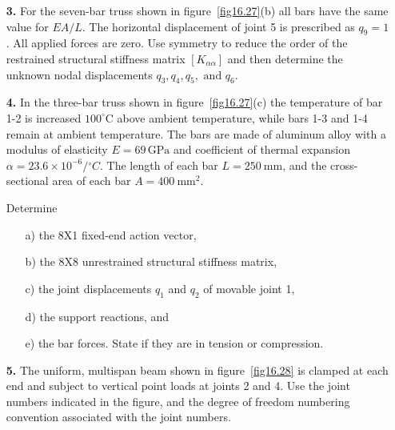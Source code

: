 \documentclass{AeroStructure-ERJohnson}
\begin{document}
\begin{exercise}
\begin{enumerate}[\textbf{2.}]
\pagebreak

\item[\textbf{3.}] For the seven-bar truss shown in figure~\ref{fig16.27}(b) all bars have the same value for $E A / L$. The horizontal displacement of joint 5 is prescribed as $q_{9}=1$. All applied forces are zero. Use symmetry to reduce the order of the restrained structural stiffness matrix $\left[K_{\alpha \alpha}\right]$ and then determine the unknown nodal displacements $q_{3}, q_{4}, q_{5}, \text { and } q_{6}$.

\item[\textbf{4.}] In the three-bar truss shown in figure~\ref{fig16.27}(c) the temperature of bar 1-2 is increased $100^{\circ} \mathrm{C}$ above ambient temperature, while bars 1-3 and 1-4 remain at ambient temperature. The bars are made of aluminum alloy with a modulus of elasticity $E=69\, \mathrm{GPa}$ and coefficient of thermal expansion $\alpha=23.6 \times 10^{-6} /{ }^{\circ} C$. The length of each bar $L=250 \mathrm{~mm}$, and the cross-sectional area of each bar $A=400 \mathrm{~mm}^{2}$.

\noindent Determine
\begin{enumerate}[b)]
\item[{\hskip13pt}a)] the 8X1 fixed-end action vector,
\item[{\hskip13pt}b)] the 8X8 unrestrained structural stiffness matrix,
\item[{\hskip13pt}c)] the joint displacements $q_{1}$ and $q_{2}$ of movable joint 1,
\item[{\hskip13pt}d)] the support reactions, and
\item[{\hskip13pt}e)] the bar forces. State if they are in tension or compression.
\end{enumerate}


\item[\textbf{5.}] The uniform, multispan beam shown in figure~\ref{fig16.28} is clamped at each end and subject to vertical point loads at joints 2 and 4. Use the joint numbers indicated in the figure, and the degree of freedom numbering convention associated with the joint numbers.


\end{enumerate}
\end{exercise}
\end{document}
